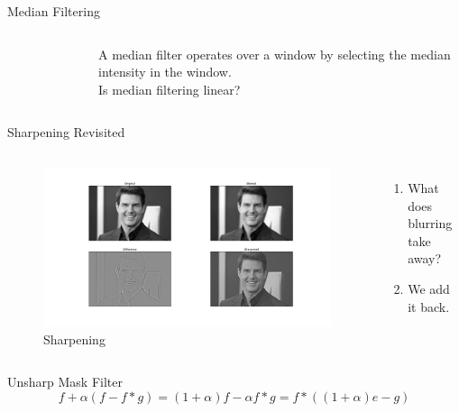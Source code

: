 \begin{frame}{Median Filtering}

    \begin{columns}[t]
        \begin{figure}
          \centering
          
          \caption{}
        \end{figure}
        A median filter operates over a window by selecting the median intensity in the window. \\
        Is median filtering linear?
    \end{columns}
    
\end{frame}

\begin{frame}{Sharpening Revisited}

    \begin{columns}[t]
        \begin{figure}
          \centering
          \includegraphics[width=\textwidth]{./figures/tom_unsharp.jpg}
          \caption{Sharpening}
        \end{figure}
        \begin{enumerate}
            \item What does blurring take away?
            \item We add it back.
        \end{enumerate}
    \end{columns}
\end{frame}

\begin{frame}{Unsharp Mask Filter}
    \begin{equation*}
        f + \alpha(f - f\ast g) = (1+\alpha)f - \alpha f\ast g = f\ast ((1+\alpha)e - g)
    \end{equation*}
    
\end{frame}